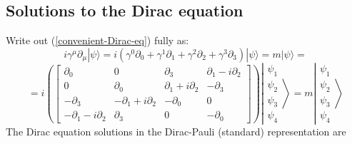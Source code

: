 \subsection{Solutions to the Dirac equation}
Write out (\ref{convenient-Dirac-eq}) fully as:
$$
i \gamma^{\mu} \partial_{\mu}|\psi\rangle= i\left(\gamma^{0} \partial_{0}+\gamma^{1} \partial_{1}+\gamma^{2} \partial_{2}+\gamma^{3} \partial_{3}\right)|\psi\rangle= m|\psi\rangle=
$$
$$
=i\left(\left[\begin{array}{cccc}
{\partial_{0}} & {0} & {\partial_{3}} & {\partial_{1}-i \partial_{2}} \\
{0} & {\partial_{0}} & {\partial_{1}+i \partial_{2}} & {-\partial_{3}} \\
{-\partial_{3}} & {-\partial_{1}+i \partial_{2}} & {-\partial_{0}} & {0} \\
{-\partial_{1}-i \partial_{2}} & {\partial_{3}} & {0} & {-\partial_{0}}
\end{array}\right]\right) \left| \begin{array}{l}
{\psi_{1}} \\
{\psi_{2}} \\
{\psi_{3}} \\
{\psi_{4}}
\end{array}\right\rangle=
m\left|\begin{array}{l}
{\psi_{1}} \\
{\psi_{2}} \\
{\psi_{3}} \\
{\psi_{4}}
\end{array}\right\rangle
$$
The Dirac equation solutions in the Dirac-Pauli (standard) representation are
